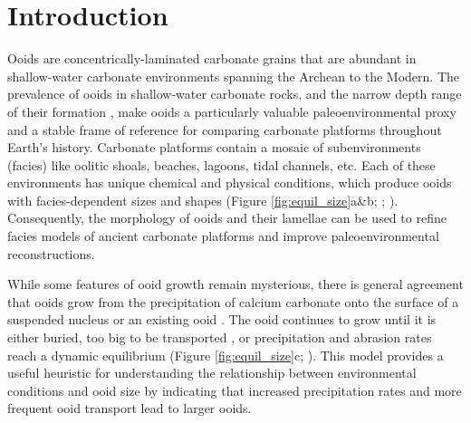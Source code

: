 \documentclass[draft]{agujournal2019}
\begin{document}
%
%
%
%


\section{Introduction}
Ooids are concentrically-laminated carbonate grains that are abundant in shallow-water carbonate environments spanning the Archean to the Modern. The prevalence of ooids in shallow-water carbonate rocks, and the narrow depth range of their formation \cite{Geyman2018,harris2019formation}, make ooids a particularly valuable paleoenvironmental proxy and a stable frame of reference for comparing carbonate platforms throughout Earth's history. Carbonate platforms contain a mosaic of subenvironments (facies) like oolitic shoals, beaches, lagoons, tidal channels, etc. Each of these environments has unique chemical and physical conditions, which produce ooids with facies-dependent sizes and shapes (Figure \ref{fig:equil_size}a\&b;  ; ). Consequently, the morphology of ooids and their lamellae can be used to refine facies models of ancient carbonate platforms and improve paleoenvironmental reconstructions. 

 While some features of ooid growth remain mysterious, there is general agreement that ooids grow from the precipitation of calcium carbonate onto the surface of a suspended nucleus or an existing ooid \cite{bathurst1972carbonate}. The ooid continues to grow until it is either buried, too big to be transported \cite{sumner1993numerical}, or precipitation and abrasion rates reach a dynamic equilibrium (Figure \ref{fig:equil_size}c; ). This model provides a useful heuristic for understanding the relationship between environmental conditions and ooid size by indicating that increased precipitation rates and more frequent ooid transport lead to larger ooids.
\end{document}
